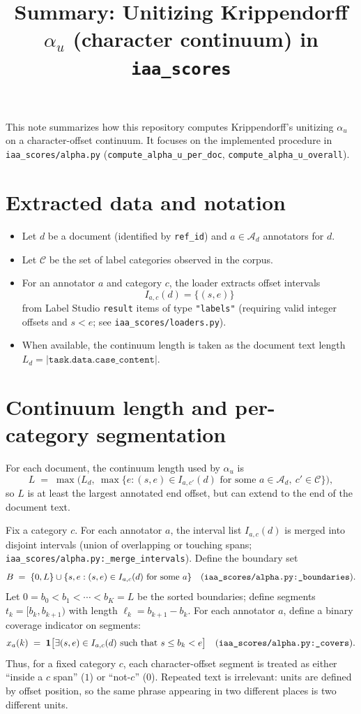 \documentclass[11pt]{article}
\title{Summary: Unitizing Krippendorff $\alpha_u$ (character continuum) in \texttt{iaa\_scores}}
\date{}
\begin{document}
\maketitle
\vspace{-1.2em}

\noindent This note summarizes how this repository computes Krippendorff's unitizing $\alpha_u$
on a character-offset continuum. It focuses on the implemented procedure in
\texttt{iaa\_scores/alpha.py} (\texttt{compute\_alpha\_u\_per\_doc}, \texttt{compute\_alpha\_u\_overall}).

\section*{Extracted data and notation}
\begin{itemize}[leftmargin=*,nosep]
  \item Let $d$ be a document (identified by \texttt{ref\_id}) and $a\in\mathcal{A}_d$ annotators for $d$.
  \item Let $\mathcal{C}$ be the set of label categories observed in the corpus.
  \item For an annotator $a$ and category $c$, the loader extracts offset intervals
  \[
    I_{a,c}(d)=\{(s,e)\}
  \]
  from Label Studio \texttt{result} items of type \texttt{"labels"} (requiring valid integer offsets and $s<e$;
  see \texttt{iaa\_scores/loaders.py}).
  \item When available, the continuum length is taken as the document text length
  $L_d = |\texttt{task.data.case\_content}|$.
\end{itemize}

\section*{Continuum length and per-category segmentation}
For each document, the continuum length used by $\alpha_u$ is
\[
L \;=\; \max\Big(L_d,\ \max\{e : (s,e)\in I_{a,c'}(d)\text{ for some }a\in\mathcal{A}_d,\ c'\in\mathcal{C}\}\Big),
\]
so $L$ is at least the largest annotated end offset, but can extend to the end of the document text.

Fix a category $c$. For each annotator $a$, the interval list $I_{a,c}(d)$ is merged into disjoint
intervals (union of overlapping or touching spans; \texttt{iaa\_scores/alpha.py:\_merge\_intervals}).
Define the boundary set
\[
B \;=\; \{0,L\}\cup\{s,e : (s,e)\in I_{a,c}(d)\text{ for some }a\}
\quad\text{(\texttt{iaa\_scores/alpha.py:\_boundaries}).}
\]
Let $0=b_0<b_1<\cdots<b_K=L$ be the sorted boundaries; define segments $t_k=[b_k,b_{k+1})$ with length
$\ell_k=b_{k+1}-b_k$. For each annotator $a$, define a binary coverage indicator on segments:
\[
x_a(k)\;=\;\mathbf{1}\big[\exists(s,e)\in I_{a,c}(d)\text{ such that } s\le b_k < e\big]
\quad\text{(\texttt{iaa\_scores/alpha.py:\_covers}).}
\]
Thus, for a fixed category $c$, each character-offset segment is treated as either
``inside a $c$ span'' ($1$) or ``not-$c$'' ($0$). Repeated text is irrelevant: units are defined
by offset position, so the same phrase appearing in two different places is two different units.
\end{document}

